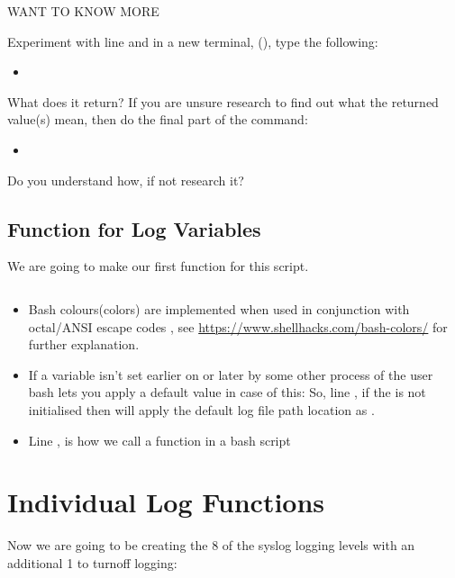\documentclass{article}
\begin{document}
\newpage

\begin{shaded} 
\textbf{\faSpaceShuttle} \hspace{1em} WANT TO KNOW MORE

Experiment with line  and in a new terminal, (), type the following:
\begin{itemize}
    \item {} 
\end{itemize}

What does it return? If you are unsure research to find out what the returned value(s) mean, then do the final part of the command:
\begin{itemize}
    \item {} 
\end{itemize}

Do you understand how, if not research it?

\end{shaded}
\subsection*{Function for Log Variables}
\label{subsec:func_lv}

We are going to make our first function for this script. 

\inputminted[frame=single,firstline=34,lastline=54,linenos]{bash}{rfclogger.sh}

\begin{itemize}
    \item Bash colours(colors) are implemented when used in conjunction with octal/ANSI escape codes \code{"\textbackslash 033[0;34m"}, see \url{https://www.shellhacks.com/bash-colors/} for further explanation.
    \item If a variable isn't set earlier on or later by some other process of the user bash lets you apply a default value in case of this: So, line , if the  is not initialised then  will apply the default log file path location as .
    \item Line , is how we call a function in a bash script
\end{itemize}

\section*{Individual Log Functions}
\label{sec:indi_lf}
Now we are going to be creating the 8 of the syslog logging levels with an additional 1 to turnoff logging:
\end{document}
